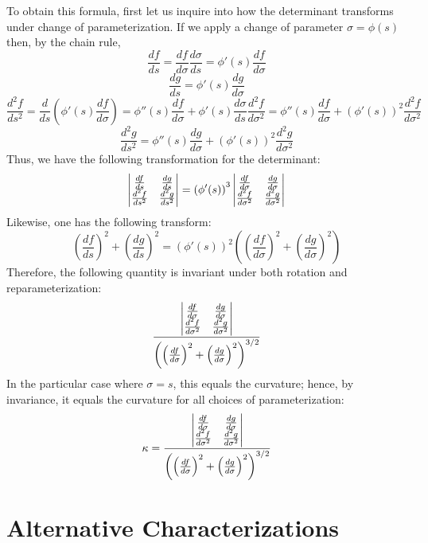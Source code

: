 \documentclass[12pt]{article}
\begin{document}
To obtain this formula, first let us inquire into how the determinant transforms under change of parameterization.  If we apply a change of parameter $\sigma = \phi (s)$ then, by the chain rule,
 \[ \frac{df}{ds} = \frac{df}{d \sigma} \frac{d \sigma}{ds} = \phi'(s) \frac{df}{d \sigma} \]
 \[ \frac{dg}{ds} = \phi'(s) \frac{dg}{d \sigma} \]
 \[ \frac{d^2 f}{ds^2} = \frac{d}{ds} \left( \phi'(s) \frac{df}{d \sigma} \right) = \phi''(s) \frac{df}{d\sigma} + \phi'(s) \frac{d\sigma}{ds} \frac{d^2 f}{d \sigma^2} = \phi''(s) \frac{df}{d \sigma} + \left( \phi'(s) \right)^2 \frac{d^2 f}{d \sigma^2}\]
  \[ \frac{d^2 g}{ds^2} = \phi''(s) \frac{dg}{d \sigma} + \left( \phi'(s) \right)^2 \frac{d^2 g}{d\sigma^2}\]
Thus, we have the following transformation for the determinant:
 \[ \left| \begin{matrix} \frac{df}{ds} & \frac{dg}{ds} \cr \frac{d^2 f}{ds^2} & \frac{d^2 g}{ds^2} \end{matrix} \right| = \left( \phi' (s) \right)^3 \left| \begin{matrix} \frac{df}{d \sigma} & \frac{dg}{d \sigma} \cr \frac{d^2 f}{d \sigma^2} & \frac{d^2 g}{d \sigma^2} \end{matrix} \right| \]
Likewise, one has the following transform:
 \[ \left( \frac{df}{ds} \right)^2 + \left( \frac{dg}{ds} \right)^2 =  \left( \phi'(s) \right)^2 \left( \left( \frac{df}{d \sigma} \right)^2 + \left( \frac{dg}{d \sigma} \right)^2 \right) \]
Therefore, the following quantity is invariant under both rotation and reparameterization:
 \[ \frac{\left| \begin{matrix} \frac{df}{d \sigma} & \frac{dg}{d \sigma} \cr \frac{d^2 f}{d \sigma^2} & \frac{d^2 g}{d \sigma^2} \end{matrix} \right|}{\left( \left( \frac{df}{d \sigma} \right)^2 + \left( \frac{dg}{d \sigma} \right)^2 \right)^{3/2}} \]
In the particular case where $\sigma = s$, this equals the curvature; hence, by invariance, it equals the curvature for all choices of parameterization:
 \[ \kappa = \frac{\left| \begin{matrix} \frac{df}{d \sigma} & \frac{dg}{d \sigma} \cr \frac{d^2 f}{d \sigma^2} & \frac{d^2 g}{d \sigma^2} \end{matrix} \right|}{\left( \left( \frac{df}{d \sigma} \right)^2 + \left( \frac{dg}{d \sigma} \right)^2 \right)^{3/2}} \]

\section{Alternative Characterizations}
\end{document}

